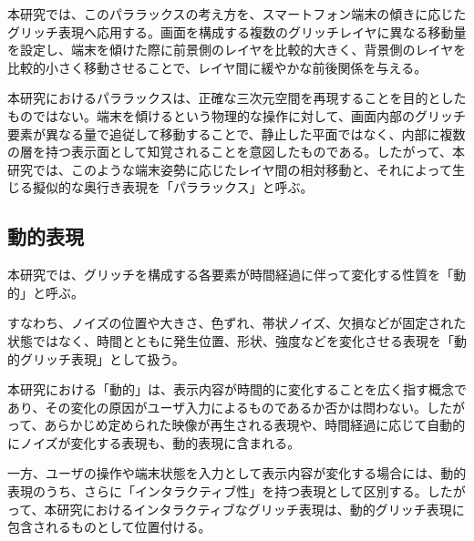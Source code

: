 本研究では、このパララックスの考え方を、スマートフォン端末の傾きに応じたグリッチ表現へ応用する。画面を構成する複数のグリッチレイヤに異なる移動量を設定し、端末を傾けた際に前景側のレイヤを比較的大きく、背景側のレイヤを比較的小さく移動させることで、レイヤ間に緩やかな前後関係を与える。

本研究におけるパララックスは、正確な三次元空間を再現することを目的としたものではない。端末を傾けるという物理的な操作に対して、画面内部のグリッチ要素が異なる量で追従して移動することで、静止した平面ではなく、内部に複数の層を持つ表示面として知覚されることを意図したものである。したがって、本研究では、このような端末姿勢に応じたレイヤ間の相対移動と、それによって生じる擬似的な奥行き表現を「パララックス」と呼ぶ。



\subsection{動的表現}

本研究では、グリッチを構成する各要素が時間経過に伴って変化する性質を「動的」と呼ぶ。

すなわち、ノイズの位置や大きさ、色ずれ、帯状ノイズ、欠損などが固定された状態ではなく、時間とともに発生位置、形状、強度などを変化させる表現を「動的グリッチ表現」として扱う。

本研究における「動的」は、表示内容が時間的に変化することを広く指す概念であり、その変化の原因がユーザ入力によるものであるか否かは問わない。したがって、あらかじめ定められた映像が再生される表現や、時間経過に応じて自動的にノイズが変化する表現も、動的表現に含まれる。

一方、ユーザの操作や端末状態を入力として表示内容が変化する場合には、動的表現のうち、さらに「インタラクティブ性」を持つ表現として区別する。したがって、本研究におけるインタラクティブなグリッチ表現は、動的グリッチ表現に包含されるものとして位置付ける。

